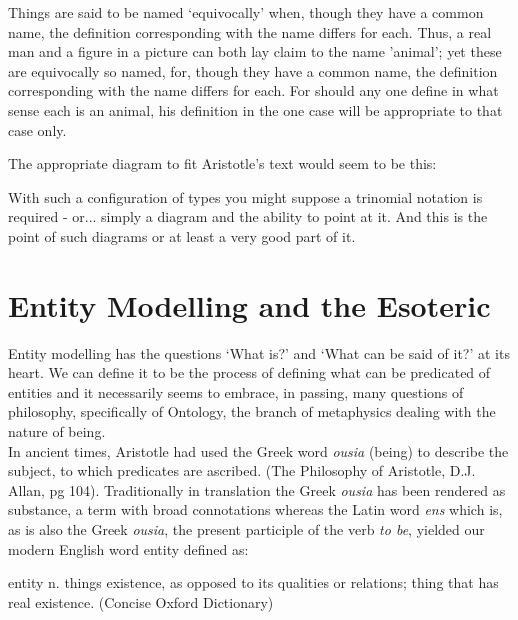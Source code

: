 \begin{erquote}
Things are said to be named `equivocally' when, though they have a common name, the definition corresponding with the name differs for each. Thus, a real man and a figure in a picture can both lay claim to the name 'animal'; yet these are equivocally so named, for, though they have a common name, the definition corresponding with the name differs for each. For should any one define in what sense each is an animal, his definition in the one case will be appropriate to that case only.\\
\end{erquote}
 
\noindent The appropriate diagram to fit Aristotle's text would seem to be this:\\


\noindent With such a configuration of types you might suppose a trinomial notation is required - or... simply a diagram and the ability to point at it. And this is the point of such diagrams or at least a very good part of it.\\


\section{Entity Modelling and the Esoteric}

\noindent Entity modelling has the questions `What is?' and `What can be said of it?' at its heart. We can define it to be the process of defining what can be predicated of entities and it necessarily seems to embrace, in passing, many questions of philosophy, specifically of Ontology, the branch of metaphysics dealing with the nature of being.\\

\noindent In ancient times, Aristotle had used the Greek word \textit{ousia} (being) to describe the subject, to which predicates are ascribed. (The Philosophy of Aristotle, D.J. Allan, pg 104). Traditionally in translation the Greek \textit{ousia} has been rendered as substance, a term with broad connotations whereas the Latin word \textit{ens} which is, as is also the Greek \textit{ousia}, the present participle of the verb \textit{to be}, yielded our modern English word entity defined as:

\begin{erquote}
entity n. things existence, as opposed to its qualities or relations; thing that has real existence. (Concise Oxford Dictionary)
\end{erquote}

